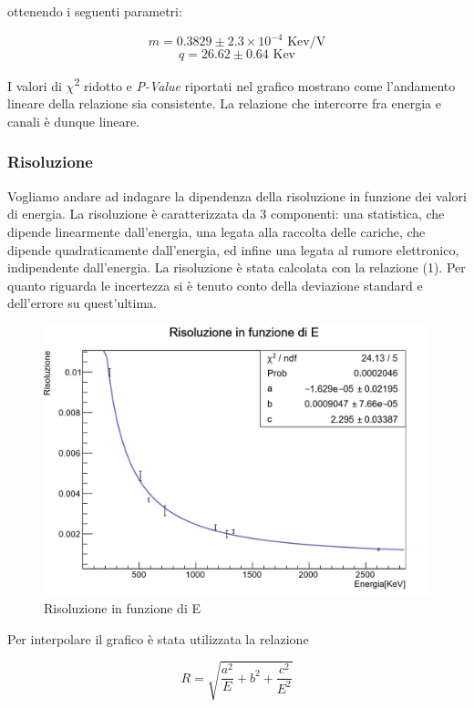 \documentclass[a4paper,10pt]{article}
\newcommand*{\unit}[1]{\ensuremath{\mathrm{\,#1}}}
\begin{document}
ottenendo i seguenti parametri:

$$
	m=0.3829 \pm 2.3 \times 10^{-4}\, \unit{Kev/V}
$$
$$
	q=26.62 \pm 0.64\, \unit{Kev}
$$

I valori di $\chi$\textsuperscript{2} ridotto e \textit{P-Value} riportati nel grafico mostrano come l'andamento lineare della relazione sia consistente. La relazione che intercorre fra energia e canali \`e dunque lineare.


\subsubsection{Risoluzione}
Vogliamo andare ad indagare la dipendenza della risoluzione in funzione dei valori di energia. La risoluzione \`e caratterizzata da 3 componenti: una statistica, che dipende linearmente dall'energia, una legata alla raccolta delle cariche, che dipende quadraticamente dall'energia, ed infine una legata al rumore elettronico, indipendente dall'energia. La risoluzione \`e stata calcolata con la relazione (1). Per quanto riguarda le incertezza si \`e tenuto conto della deviazione standard e dell'errore su quest'ultima. 

\begin{figure}[H]
    \centering
    \includegraphics[scale=0.45]{grafici/risoluzionesources}
    \caption{Risoluzione in funzione di E}
\end{figure}

Per interpolare il grafico \`e stata utilizzata la relazione

\begin{equation}
	R=\sqrt{\frac{a^2}{E}+b^2+\frac{c^2}{E^2}}
\end{equation}
\end{document}
